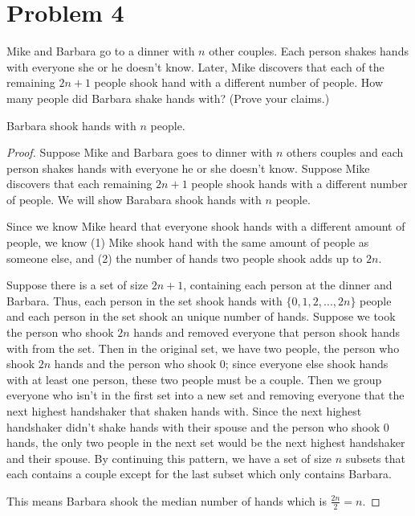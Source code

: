 \documentclass{article}
\begin{document}

    \section*{Problem 4}

    Mike and Barbara go to a dinner with $n$ other couples. Each person shakes
    hands with everyone she or he doesn't know. Later, Mike discovers that
    each of the remaining $2n + 1$ people shook hand with a different number
    of people. How many people did Barbara shake hands with? (Prove your
    claims.)

    Barbara shook hands with $n$ people. 

    \begin{proof}
        Suppose Mike and Barbara goes to dinner with $n$ others couples and each person shakes hands with everyone he or she doesn't know. Suppose Mike discovers that each remaining $2n+1$ people shook hands with a different number of people. We will show Barabara shook hands with $n$ people.

        Since we know Mike heard that everyone shook hands with a different amount of people, we know (1) Mike shook hand with the same amount of people as someone else, and (2) the number of hands two people shook adds up to $2n$.

        Suppose there is a set of size $2n+1$, containing each person at the dinner and Barbara. Thus, each person in the set shook hands with $\{0,1,2,...,2n\}$ people and each person in the set shook an unique number of hands. Suppose we took the person who shook $2n$ hands and removed everyone that person shook hands with from the set. Then in the original set, we have two people, the person who shook $2n$ hands and the person who shook $0$; since everyone else shook hands with at least one person, these two people must be a couple. Then we group everyone who isn't in the first set into a new set and removing everyone that the next highest handshaker that shaken hands with. Since the next highest handshaker didn't shake hands with their spouse and the person who shook $0$ hands, the only two people in the next set would be the next highest handshaker and their spouse. By continuing this pattern, we have a set of size $n$ subsets that each contains a couple except for the last subset which only contains Barbara.

        This means Barbara shook the median number of hands which is $\frac{2n}{2} = n$.
    \end{proof}
\end{document}
